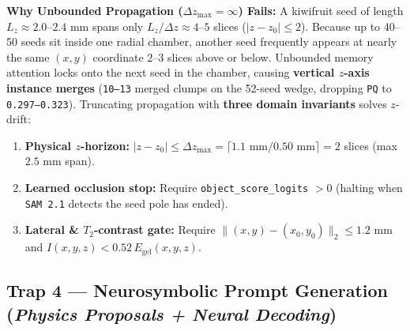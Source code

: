 \documentclass[10.5pt,a4paper]{article}
\begin{document}
\textbf{Why Unbounded Propagation ($\Delta z_{\max} = \infty$) Fails:} A kiwifruit seed of length $L_z \approx 2.0\text{--}2.4\text{ mm}$ spans only $L_z / \Delta z \approx 4\text{--}5$ slices ($\lvert z - z_0 \rvert \le 2$). Because up to 40--50 seeds sit inside one radial chamber, another seed frequently appears at nearly the same $(x, y)$ coordinate $2\text{--}3$ slices above or below. Unbounded memory attention locks onto the next seed in the chamber, causing \textbf{vertical $z$-axis instance merges} (\texttt{10--13} merged clumps on the 52-seed wedge, dropping \texttt{PQ} to \texttt{0.297--0.323}). Truncating propagation with \textbf{three domain invariants} solves $z$-drift:
\begin{enumerate}
    \item \textbf{Physical $z$-horizon:} $\lvert z - z_0 \rvert \le \Delta z_{\max} = \lceil 1.1\text{ mm} / 0.50\text{ mm} \rceil = 2$ slices (max $2.5\text{ mm}$ span).
    \item \textbf{Learned occlusion stop:} Require \texttt{object\_score\_logits} $> 0$ (halting when \texttt{SAM 2.1} detects the seed pole has ended).
    \item \textbf{Lateral \& $T_2$-contrast gate:} Require $\lVert(x,y) - (x_0,y_0)\rVert_2 \le 1.2\text{ mm}$ and $I(x,y,z) < 0.52\,E_{\text{gel}}(x,y,z)$.
\end{enumerate}

\subsection{Trap 4 --- Neurosymbolic Prompt Generation (\emph{Physics Proposals + Neural Decoding})}
\end{document}

